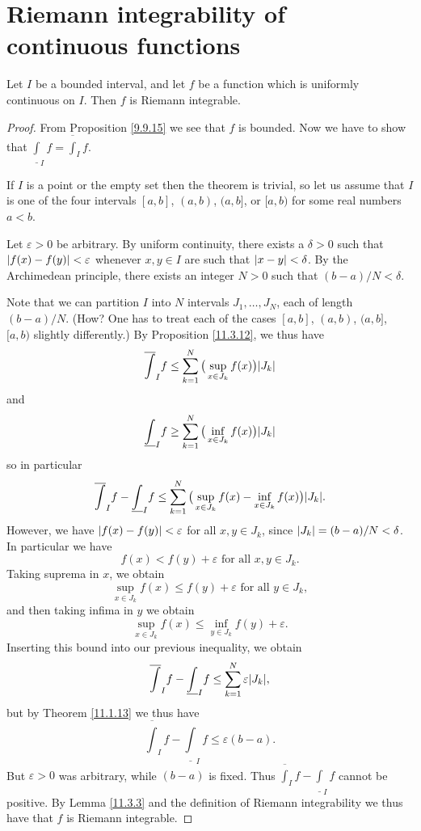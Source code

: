 \section{Riemann integrability of continuous functions}\label{sec 11.5}

\begin{theorem}\label{11.5.1}
    Let \(I\) be a bounded interval, and let \(f\) be a function which is uniformly continuous on \(I\).
    Then \(f\) is Riemann integrable.
\end{theorem}

\begin{proof}
    From Proposition \ref{9.9.15} we see that \(f\) is bounded.
    Now we have to show that \(\underline{\int}_I f = \overline{\int}_I f\).

    If \(I\) is a point or the empty set then the theorem is trivial, so let us assume that \(I\) is one of the four intervals \([a, b]\), \((a, b)\), \((a, b]\), or \([a, b)\) for some real numbers \(a < b\).

            Let \(\varepsilon > 0\) be arbitrary.
            By uniform continuity, there exists a \(\delta > 0\) such that \(\abs*{f(x) - f(y)} < \varepsilon\) whenever \(x, y \in I\) are such that \(\abs*{x - y} < \delta\).
            By the Archimedean principle, there exists an integer \(N > 0\) such that \((b - a) / N < \delta\).

            Note that we can partition \(I\) into \(N\) intervals \(J_1, \dots, J_N\), each of length \((b - a) / N\).
            (How? One has to treat each of the cases \([a, b]\), \((a, b)\), \((a, b]\), \([a, b)\) slightly differently.)
    By Proposition \ref{11.3.12}, we thus have
    \[
        \overline{\int}_I f \leq \sum_{k = 1}^N \big(\sup_{x \in J_k} f(x)\big) \abs*{J_k}
    \]
    and
    \[
        \underline{\int}_I f \geq \sum_{k = 1}^N \big(\inf_{x \in J_k} f(x)\big) \abs*{J_k}
    \]
    so in particular
    \[
        \overline{\int}_I f - \underline{\int}_I f \leq \sum_{k = 1}^N \big(\sup_{x \in J_k} f(x) - \inf_{x \in J_k} f(x)\big) \abs*{J_k}.
    \]
    However, we have \(\abs*{f(x) - f(y)} < \varepsilon\) for all \(x, y \in J_k\), since \(\abs*{J_k} = (b - a) / N < \delta\).
    In particular we have
    \[
        f(x) < f(y) + \varepsilon \text{ for all } x, y \in J_k.
    \]
    Taking suprema in \(x\), we obtain
    \[
        \sup_{x \in J_k} f(x) \leq f(y) + \varepsilon \text{ for all } y \in J_k,
    \]
    and then taking infima in \(y\) we obtain
    \[
        \sup_{x \in J_k} f(x) \leq \inf_{y \in J_k} f(y) + \varepsilon.
    \]
    Inserting this bound into our previous inequality, we obtain
    \[
        \overline{\int}_I f - \underline{\int}_I f \leq \sum_{k = 1}^N \varepsilon \abs*{J_k},
    \]
    but by Theorem \ref{11.1.13} we thus have
    \[
        \overline{\int}_I f - \underline{\int}_I f \leq \varepsilon (b - a).
    \]
    But \(\varepsilon > 0\) was arbitrary, while \((b - a)\) is fixed.
    Thus \(\overline{\int}_I f - \underline{\int}_I f\) cannot be positive.
    By Lemma \ref{11.3.3} and the definition of Riemann integrability we thus have that \(f\) is Riemann integrable.
\end{proof}

